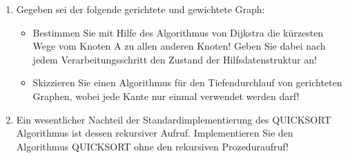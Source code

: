 \documentclass{bschlangaul-aufgabe}
\begin{document}
\begin{enumerate}
\begin{enumerate}
\begin{bAntwort}
\begin{bBaum}{Nach dem Einfügen von „10“}
\end{bBaum}
\end{bAntwort}

\item Löschen Sie das Wurzelelement des entstandenen AVL-Baums und
stellen Sie die AVL-Eigenschaft wieder her!

\begin{bAntwort}
\begin{bBaum}{Nach dem Löschen von „8“}
\end{bBaum}
\end{bAntwort}
\end{enumerate}


\item Gegeben sei der folgende gerichtete und gewichtete Graph:

\begin{itemize}
\item Bestimmen Sie mit Hilfe des Algorithmus von Dijkstra die kürzesten
Wege vom Knoten A zu allen anderen Knoten! Geben Sie dabei nach jedem
Verarbeitungsschritt den Zustand der Hilfsdatenstruktur an!

\item Skizzieren Sie einen Algorithmus für den Tiefendurchlauf von
gerichteten Graphen, wobei jede Kante nur einmal verwendet werden darf!

\end{itemize}

\item Ein wesentlicher Nachteil der Standardimplementierung des
QUICKSORT Algorithmus ist dessen rekursiver Aufruf. Implementieren Sie
den Algorithmus QUICKSORT ohne den rekursiven Prozeduraufruf!

\end{enumerate}
\end{document}

